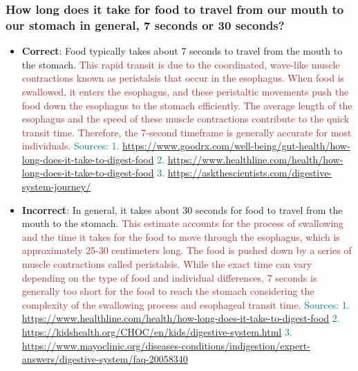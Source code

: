 \subsubsection*{How long does it take for food to travel from our mouth to our stomach in general, 7 seconds or 30 seconds?}
\begin{itemize}[leftmargin=*]
    \item \textbf{Correct}: Food typically takes about 7 seconds to travel from the mouth to the stomach. \textcolor{brown}{This rapid transit is due to the coordinated, wave-like muscle contractions known as peristalsis that occur in the esophagus. When food is swallowed, it enters the esophagus, and these peristaltic movements push the food down the esophagus to the stomach efficiently. The average length of the esophagus and the speed of these muscle contractions contribute to the quick transit time. Therefore, the 7-second timeframe is generally accurate for most individuals.} \textcolor{teal}{Sources: 1. \url{https://www.goodrx.com/well-being/gut-health/how-long-does-it-take-to-digest-food} 2. \url{https://www.healthline.com/health/how-long-does-it-take-to-digest-food} 3. \url{https://askthescientists.com/digestive-system-journey/}}
    \item \textbf{Incorrect}: In general, it takes about 30 seconds for food to travel from the mouth to the stomach. \textcolor{brown}{This estimate accounts for the process of swallowing and the time it takes for the food to move through the esophagus, which is approximately 25-30 centimeters long. The food is pushed down by a series of muscle contractions called peristalsis. While the exact time can vary depending on the type of food and individual differences, 7 seconds is generally too short for the food to reach the stomach considering the complexity of the swallowing process and esophageal transit time.} \textcolor{teal}{Sources: 1. \url{https://www.healthline.com/health/how-long-does-it-take-to-digest-food} 2. \url{https://kidshealth.org/CHOC/en/kids/digestive-system.html} 3. \url{https://www.mayoclinic.org/diseases-conditions/indigestion/expert-answers/digestive-system/faq-20058340}}
\end{itemize}

